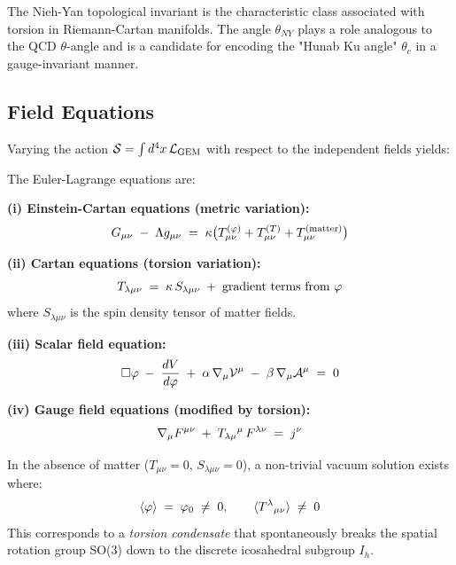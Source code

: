 \begin{remark}
The Nieh-Yan topological invariant \cite{NiehYan1982} is the characteristic class associated with torsion in Riemann-Cartan manifolds. The angle $\theta_{NY}$ plays a role analogous to the QCD $\theta$-angle and is a candidate for encoding the "Hunab Ku angle" $\theta_c$ in a gauge-invariant manner.
\end{remark}

\subsection{Field Equations}

Varying the action $\mathcal{S} = \int d^4x\, \mathcal{L}_{\text{GEM}}$ with respect to the independent fields yields:

\begin{theorem}
The Euler-Lagrange equations are:

\textbf{(i) Einstein-Cartan equations (metric variation):}
\begin{equation}
    G_{\mu\nu} \;-\; \Lambda g_{\mu\nu} \;=\; \kappa\big( T^{(\varphi)}_{\mu\nu} + T^{(T)}_{\mu\nu} + T^{(\text{matter})}_{\mu\nu} \big)
\end{equation}

\textbf{(ii) Cartan equations (torsion variation):}
\begin{equation}
    T_{\lambda\mu\nu} \;=\; \kappa\, S_{\lambda\mu\nu} \;+\; \text{gradient terms from } \varphi
\end{equation}
where $S_{\lambda\mu\nu}$ is the spin density tensor of matter fields.

\textbf{(iii) Scalar field equation:}
\begin{equation}
    \square \varphi \;-\; \frac{dV}{d\varphi} \;+\; \alpha\, \nabla_\mu \mathcal{V}^\mu \;-\; \beta\, \nabla_\mu \mathcal{A}^\mu \;=\; 0
\end{equation}

\textbf{(iv) Gauge field equations (modified by torsion):}
\begin{equation}
    \nabla_\mu F^{\mu\nu} \;+\; T_{\lambda\mu}{}^\mu\, F^{\lambda\nu} \;=\; j^\nu
\end{equation}
\end{theorem}

\begin{corollary}
In the absence of matter ($T_{\mu\nu} = 0$, $S_{\lambda\mu\nu} = 0$), a non-trivial vacuum solution exists where:
\begin{equation}
    \langle \varphi \rangle \;=\; \varphi_0 \;\neq\; 0, \qquad \langle T^\lambda{}_{\mu\nu} \rangle \;\neq\; 0
\end{equation}
This corresponds to a \textit{torsion condensate} that spontaneously breaks the spatial rotation group SO(3) down to the discrete icosahedral subgroup $I_h$.
\end{corollary}

